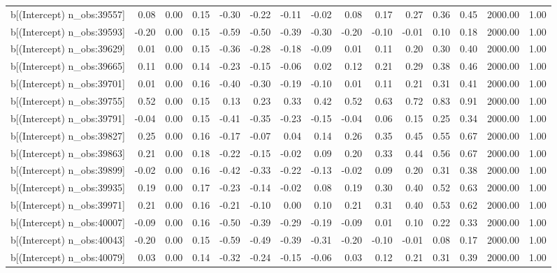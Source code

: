 \begin{table}[ht]
\begin{tabular}{rrrrrrrrrrrrrrr}
  b[(Intercept) n\_obs:39557] & 0.08 & 0.00 & 0.15 & -0.30 & -0.22 & -0.11 & -0.02 & 0.08 & 0.17 & 0.27 & 0.36 & 0.45 & 2000.00 & 1.00 \\ 
  b[(Intercept) n\_obs:39593] & -0.20 & 0.00 & 0.15 & -0.59 & -0.50 & -0.39 & -0.30 & -0.20 & -0.10 & -0.01 & 0.10 & 0.18 & 2000.00 & 1.00 \\ 
  b[(Intercept) n\_obs:39629] & 0.01 & 0.00 & 0.15 & -0.36 & -0.28 & -0.18 & -0.09 & 0.01 & 0.11 & 0.20 & 0.30 & 0.40 & 2000.00 & 1.00 \\ 
  b[(Intercept) n\_obs:39665] & 0.11 & 0.00 & 0.14 & -0.23 & -0.15 & -0.06 & 0.02 & 0.12 & 0.21 & 0.29 & 0.38 & 0.46 & 2000.00 & 1.00 \\ 
  b[(Intercept) n\_obs:39701] & 0.01 & 0.00 & 0.16 & -0.40 & -0.30 & -0.19 & -0.10 & 0.01 & 0.11 & 0.21 & 0.31 & 0.41 & 2000.00 & 1.00 \\ 
  b[(Intercept) n\_obs:39755] & 0.52 & 0.00 & 0.15 & 0.13 & 0.23 & 0.33 & 0.42 & 0.52 & 0.63 & 0.72 & 0.83 & 0.91 & 2000.00 & 1.00 \\ 
  b[(Intercept) n\_obs:39791] & -0.04 & 0.00 & 0.15 & -0.41 & -0.35 & -0.23 & -0.15 & -0.04 & 0.06 & 0.15 & 0.25 & 0.34 & 2000.00 & 1.00 \\ 
  b[(Intercept) n\_obs:39827] & 0.25 & 0.00 & 0.16 & -0.17 & -0.07 & 0.04 & 0.14 & 0.26 & 0.35 & 0.45 & 0.55 & 0.67 & 2000.00 & 1.00 \\ 
  b[(Intercept) n\_obs:39863] & 0.21 & 0.00 & 0.18 & -0.22 & -0.15 & -0.02 & 0.09 & 0.20 & 0.33 & 0.44 & 0.56 & 0.67 & 2000.00 & 1.00 \\ 
  b[(Intercept) n\_obs:39899] & -0.02 & 0.00 & 0.16 & -0.42 & -0.33 & -0.22 & -0.13 & -0.02 & 0.09 & 0.20 & 0.31 & 0.38 & 2000.00 & 1.00 \\ 
  b[(Intercept) n\_obs:39935] & 0.19 & 0.00 & 0.17 & -0.23 & -0.14 & -0.02 & 0.08 & 0.19 & 0.30 & 0.40 & 0.52 & 0.63 & 2000.00 & 1.00 \\ 
  b[(Intercept) n\_obs:39971] & 0.21 & 0.00 & 0.16 & -0.21 & -0.10 & 0.00 & 0.10 & 0.21 & 0.31 & 0.40 & 0.53 & 0.62 & 2000.00 & 1.00 \\ 
  b[(Intercept) n\_obs:40007] & -0.09 & 0.00 & 0.16 & -0.50 & -0.39 & -0.29 & -0.19 & -0.09 & 0.01 & 0.10 & 0.22 & 0.33 & 2000.00 & 1.00 \\ 
  b[(Intercept) n\_obs:40043] & -0.20 & 0.00 & 0.15 & -0.59 & -0.49 & -0.39 & -0.31 & -0.20 & -0.10 & -0.01 & 0.08 & 0.17 & 2000.00 & 1.00 \\ 
  b[(Intercept) n\_obs:40079] & 0.03 & 0.00 & 0.14 & -0.32 & -0.24 & -0.15 & -0.06 & 0.03 & 0.12 & 0.21 & 0.31 & 0.39 & 2000.00 & 1.00 \\ 

\end{tabular}
\end{table}
